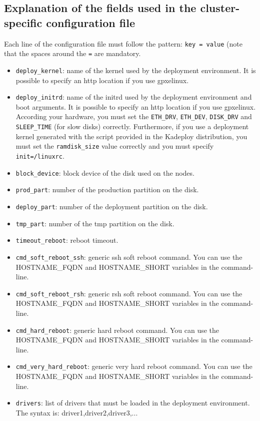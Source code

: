 \documentclass[a4wide,10pt,oneside]{book}
\begin{document}
\subsection{Explanation of the fields used in the cluster-specific configuration file}
Each line of the configuration file must follow the pattern: \texttt{key = value} (note that the spaces around the \texttt{=} are mandatory.
\begin{itemize}
\item \texttt{deploy\_kernel}: name of the kernel used by the deployment environment. It is possible to specify an http location if you use gpxelinux.
\item \texttt{deploy\_initrd}: name of the initrd used by the deployment environment and boot arguments. It is possible to specify an http location if you use gpxelinux. According your hardware, you must set the \texttt{ETH\_DRV}, \texttt{ETH\_DEV}, \texttt{DISK\_DRV} and \texttt{SLEEP\_TIME} (for slow disks) correctly. Furthermore, if you use a deployment kernel generated with the script provided in the Kadeploy distribution, you must set the \texttt{ramdisk\_size} value correctly and you must specify \texttt{init=/linuxrc}.
\item \texttt{block\_device}: block device of the disk used on the nodes.
\item \texttt{prod\_part}: number of the production partition on the disk.
\item \texttt{deploy\_part}: number of the deployment partition on the disk.
\item \texttt{tmp\_part}: number of the tmp partition on the disk.
\item \texttt{timeout\_reboot}: reboot timeout.
\item \texttt{cmd\_soft\_reboot\_ssh}: generic ssh soft reboot command. You can use the HOSTNAME\_FQDN and HOSTNAME\_SHORT variables in the command-line.
\item \texttt{cmd\_soft\_reboot\_rsh}: generic rsh soft reboot command. You can use the HOSTNAME\_FQDN and HOSTNAME\_SHORT variables in the command-line.
\item \texttt{cmd\_hard\_reboot}: generic hard reboot command. You can use the HOSTNAME\_FQDN and HOSTNAME\_SHORT variables in the command-line.
\item \texttt{cmd\_very\_hard\_reboot}: generic very hard reboot command. You can use the HOSTNAME\_FQDN and HOSTNAME\_SHORT variables in the command-line.
\item \texttt{drivers}: list of drivers that must be loaded in the deployment environment. The syntax is: driver1,driver2,driver3,...

\end{itemize}
\end{document}
